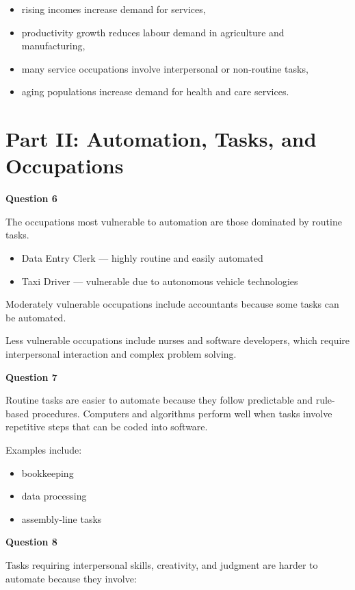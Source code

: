 \documentclass[12pt]{article}
\begin{document}
\begin{itemize}
\item rising incomes increase demand for services,
\item productivity growth reduces labour demand in agriculture and manufacturing,
\item many service occupations involve interpersonal or non-routine tasks,
\item aging populations increase demand for health and care services.
\end{itemize}

\section*{Part II: Automation, Tasks, and Occupations}

\textbf{Question 6}

The occupations most vulnerable to automation are those dominated by routine tasks.

\begin{itemize}
\item Data Entry Clerk --- highly routine and easily automated
\item Taxi Driver --- vulnerable due to autonomous vehicle technologies
\end{itemize}

Moderately vulnerable occupations include accountants because some tasks can be automated.

Less vulnerable occupations include nurses and software developers, which require interpersonal interaction and complex problem solving.

\textbf{Question 7}

Routine tasks are easier to automate because they follow predictable and rule-based procedures. Computers and algorithms perform well when tasks involve repetitive steps that can be coded into software.

Examples include:

\begin{itemize}
\item bookkeeping
\item data processing
\item assembly-line tasks
\end{itemize}

\textbf{Question 8}

Tasks requiring interpersonal skills, creativity, and judgment are harder to automate because they involve:
\end{document}
